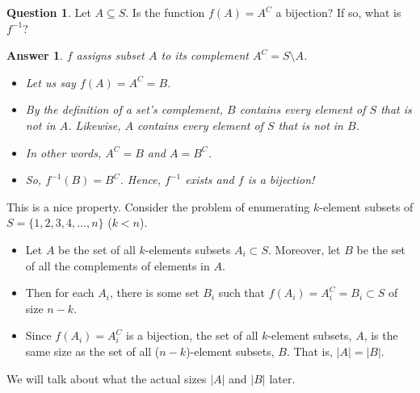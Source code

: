 \documentclass[openany]{book}
\newtheorem{answer}[thm]{Answer}
\theoremstyle{definition}
\newtheorem{question}[thm]{Question}
\begin{document}
\begin{question}\hfill

    Let $A\subseteq S$. Is the function $f(A)=A^C$ a bijection? If so, what is $f^{-1}$?
\end{question}
\begin{answer}\hfill

$f$ assigns subset $A$ to its complement $A^C=S\setminus A$. 
    \begin{itemize}
        \item Let us say $f(A)=A^C=B$.
        \item By the definition of a set's complement, $B$ contains every element of $S$ that is not in $A$. Likewise, $A$ contains every element of $S$ that is not in $B$.
        \item In other words, $A^C=B$ \emph{and} $A=B^C$.
        \item So, $f^{-1}(B)=B^C$. Hence, $f^{-1}$ exists and $f$ is a bijection!
    \end{itemize}
\end{answer}
\vspace{.5em}
This is a nice property. Consider the problem of enumerating $k$-element subsets of $S=\{1,2,3,4,\dots, n\}$ ($k<n$).
    \begin{itemize}
        \item Let $A$ be the set of all $k$-elements subsets $A_i\subset S$. Moreover, let $B$ be the set of all the complements of elements in $A$.
        \item Then for each $A_i$, there is some set $B_i$ such that $f(A_i)=A_i^C=B_i\subset S$ of size $n-k$. 
        \item Since $f(A_i)=A_i^C$ is a bijection, the set of all $k$-element subsets, $A$, is the same size as the set of all ($n-k$)-element subsets, $B$. That is, $|A|=|B|$.
    \end{itemize}
    We will talk about what the actual sizes $|A|$ and $|B|$ later.
\end{document}
